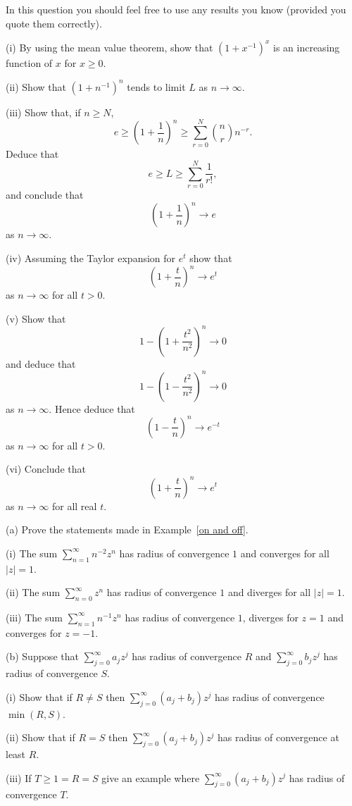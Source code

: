 \begin{question}
In this question you should feel free
to use any results you know (provided you quote them 
correctly).

(i) By using the mean value theorem, show that 
$(1+x^{-1})^{x}$  is an increasing function of
$x$ for $x\geq 0$.

(ii) Show that $(1+n^{-1})^{n}$ tends to limit $L$
as $n\rightarrow\infty$.

(iii) Show that, if $n\geq N$,
\[e\geq \left(1+\frac{1}{n}\right)^{n}\geq 
\sum_{r=0}^{N}\binom{n}{r}n^{-r}.\]
Deduce that
\[e\geq L\geq \sum_{r=0}^{N}\frac{1}{r!},\]
and conclude that
\[\left(1+\frac{1}{n}\right)^{n}\rightarrow e\]
as $n\rightarrow\infty$.

(iv) Assuming the Taylor expansion for $e^{t}$ show
that
\[\left(1+\frac{t}{n}\right)^{n}\rightarrow e^{t}\]
as $n\rightarrow\infty$ for all $t>0$.

(v) Show that
\[1-\left(1+\frac{t^{2}}{n^{2}}\right)^{n}\rightarrow 0\]
and deduce that
\[1-\left(1-\frac{t^{2}}{n^{2}}\right)^{n}\rightarrow 0\]
as $n\rightarrow\infty$.
Hence deduce that
\[\left(1-\frac{t}{n}\right)^{n}\rightarrow e^{-t}\]
as $n\rightarrow\infty$ for all $t>0$.

(vi) Conclude that 
\[\left(1+\frac{t}{n}\right)^{n}\rightarrow e^{t}\]
as $n\rightarrow\infty$ for all real $t$.

\end{question}
\begin{question} (a) Prove the statements made in
Example~\ref{on and off}.

(i) The sum $\sum_{n=1}^{\infty}n^{-2}z^{n}$
has radius of convergence $1$ and converges for all $|z|=1$.

(ii) The sum $\sum_{n=0}^{\infty}z^{n}$
has radius of convergence $1$ and diverges for all $|z|=1$.

(iii) The sum $\sum_{n=1}^{\infty}n^{-1}z^{n}$
has radius of convergence $1$, diverges for $z=1$
and converges for $z=-1$.

(b) Suppose
that $\sum_{j=0}^{\infty}a_{j}z^{j}$ has radius of convergence
$R$ and $\sum_{j=0}^{\infty}b_{j}z^{j}$ has radius of
convergence $S$.

(i) Show that if $R\neq S$ then
$\sum_{j=0}^{\infty}(a_{j}+b_{j})z^{j}$ has radius of convergence
$\min(R,S)$.

(ii) Show that if $R=S$ then
$\sum_{j=0}^{\infty}(a_{j}+b_{j})z^{j}$ has radius of convergence
at least $R$.

(iii) If $T\geq 1=R=S$ give an example where
$\sum_{j=0}^{\infty}(a_{j}+b_{j})z^{j}$ has radius of convergence
$T$.
\end{question}
